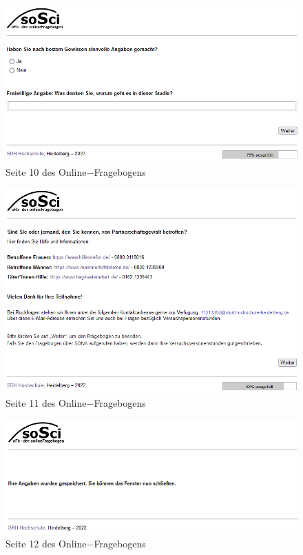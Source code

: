 \begin{appendices}
    \begin{figure}[htb!]
        \centering
            \includegraphics[width=\textwidth]{Seite 10.png}
            \caption[]{Seite 10 des Online$-$Fragebogens}
    \end{figure}
    
    \newpage
    \begin{figure}[htb!]
        \centering
            \includegraphics[width=\textwidth]{Seite 11.png}
            \caption[]{Seite 11 des Online$-$Fragebogens}
    \end{figure}
    
    \begin{figure}[htb!]
        \centering
            \includegraphics[width=\textwidth]{Seite 12.png}
            \caption[]{Seite 12 des Online$-$Fragebogens}
    \end{figure}


    
    

\end{appendices}







